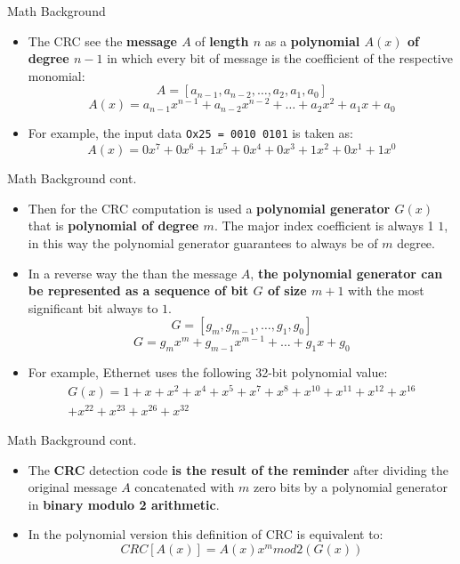 \documentclass[10pt]{beamer}
\begin{document}
\begin{frame}[fragile]{Math Background}
\begin{itemize}
\item The CRC see the \textbf{message $A$} of \textbf{length $n$} as a 
\textbf{polynomial $A(x)$ of degree $n-1$} in which every bit of message 
is the coefficient of the respective monomial:
\[
   A=[a_{n-1},a_{n-2},\dots{},a_{2},a_{1},a_{0}]
\]
\[
   A(x)=a_{n-1}x^{n-1}+a_{n-2}x^{n-2}+\dots{}+a_{2}x^{2}+a_{1}x+a_{0}
\]

\item For example, the input data \verb|Ox25 = 0010 0101| is taken as:
\[
   A(x)=0x^{7}+0x^{6}+1x^{5}+0x^{4}+0x^{3}+1x^{2}+0x^{1}+1x^{0}
\]
\end{itemize}
\end{frame}


\begin{frame}[fragile]{Math Background cont.}
\begin{itemize}
\item Then for the CRC computation is used a 
\textbf{polynomial generator $G(x)$} that is 
\textbf{polynomial of degree $m$}. The major index coefficient is always 
1 $1$, in this way the polynomial generator guarantees to always be 
of $m$ degree.

\item In a reverse way the than the message $A$, \textbf{the polynomial 
generator can be represented as a sequence of bit $G$ of size $m+1$} 
with the most significant bit always to $1$.
\[
   G=[g_{m},g_{m-1},\dots{},g_{1},g_{0}] 
\]
\[
   G=g_{m}x^{m}+g_{m-1}x^{m-1}+\dots{}+g_{1}x+g_{0}
\]

\item For example, Ethernet uses the following 32-bit polynomial value:
\begin{gather*}
   G(x)=1+x+x^{2}+x^{4}+x^{5}+x^{7}+x^{8}+x^{10}+x^{11}+x^{12}+x^{16} \\
   +x^{22}+x^{23}+x^{26}+x^{32}
\end{gather*}
\end{itemize}
\end{frame}


\begin{frame}[fragile]{Math Background cont.}
\begin{itemize}
\item The \textbf{CRC} detection code \textbf{is the result of the reminder} 
after dividing the original message $A$ concatenated with $m$ zero bits 
by a polynomial generator in \textbf{binary modulo 2 arithmetic}.

\item In the polynomial version this definition of CRC is equivalent to:
\[
   CRC[A(x)]=A(x)x^{m}mod2(G(x))
\]
\end{itemize}
\end{frame}
\end{document}
